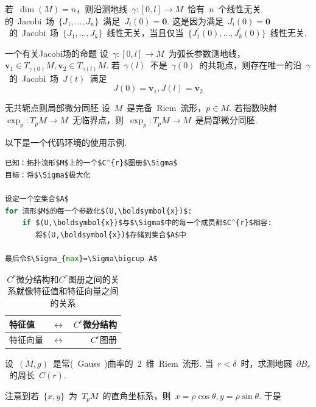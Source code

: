 \begin{remark}\label{一个注}
	若~$\operatorname{dim}(M)=n$，则沿测地线~$\gamma:[0,l]\longrightarrow M$~恰有~$n$~个线性无关的~Jacobi~场~$\{J_{1},\ldots,J_{n} \}$~满足~$J_{i}(0)=\boldsymbol{0}$. 这是因为满足~$J_{i}(0)=\boldsymbol{0}$~的~Jacobi~场~$\{J_{1},\ldots,J_{k}\}$~线性无关，当且仅当~$\{J_{1}^{\prime}(0),\ldots,J_{k}^{\prime}(0)\}$~线性无关.
\end{remark}

\begin{mypron}{}{一个有关Jacobi场的命题}
	设~$\gamma:[0,l]\longrightarrow M$~为弧长参数测地线，$\boldsymbol{v}_{1}\in T_{\gamma(0)}M,\boldsymbol{v}_{2}\in T_{\gamma(l)}M$. 若~$\gamma(l)$~不是~$\gamma(0)$~的共轭点，则存在唯一的沿~$\gamma$~的~Jacobi~场~$J(t)$~满足
   \[
      J(0)=\boldsymbol{v}_{1},J(l)=\boldsymbol{v}_{2}
   \]
\end{mypron}

\begin{mylem}{}{无共轭点则局部微分同胚}
	设~$M$~是完备~Riem~流形，$p\in M$. 若指数映射~$\operatorname{exp}_{p}:T_{p}M\longrightarrow M$~无临界点，则~$\operatorname{exp}_{p}:T_{p}M\longrightarrow M$~是局部微分同胚.
\end{mylem}

以下是一个代码环境的使用示例.

\begin{lstlisting}[language={python}, caption={图册的极大化}]
已知：拓扑流形$M$上的一个$C^{r}$图册$\Sigma$
目标：将$\Sigma$极大化

设定一个空集合$A$
for 流形$M$的每一个参数化$(U,\boldsymbol{x})$:
    if $(U,\boldsymbol{x})$与$\Sigma$中的每一个成员都$C^{r}$相容:
       将$(U,\boldsymbol{x})$存储到集合$A$中
       
最后令$\Sigma_{max}=\Sigma\bigcup A$
\end{lstlisting}

\begin{table}[!hpb]
	\centering
	\begin{tabular}{@{}llr@{}} \toprule
		特征值 & $\longleftrightarrow$ &$C^{r}$微分结构\\
		\midrule
		特征向量 & $\longleftrightarrow$ & $C^{r}$图册 \\ \bottomrule
	\end{tabular}
	\caption{$C^{r}$微分结构和$C^{r}$图册之间的关系就像特征值和特征向量之间的关系}
	\label{一个类比}
\end{table}

\begin{example}\label{第一个例子}
	设~$(M,g)$~是常(~Gauss~)曲率的~$2$~维~Riem~流形. 当~$r<\delta $~时，求测地圆~$\partial B_{r}$~的周长~$C(r)$.
	\soln 
	
	注意到若~$\{x,y\}$~为~$T_{p}M$~的直角坐标系，则~$x=\rho \cos\theta,y=\rho\sin\theta$. 于是
\end{example}

